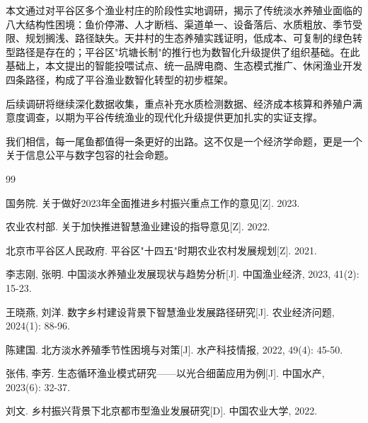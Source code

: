 \documentclass[12pt,a4paper]{article}
\begin{document}
本文通过对平谷区多个渔业村庄的阶段性实地调研，揭示了传统淡水养殖业面临的八大结构性困境：鱼价停滞、人才断档、渠道单一、设备落后、水质粗放、季节受限、规划搁浅、路径缺失。天井村的生态养殖实践证明，低成本、可复制的绿色转型路径是存在的；平谷区"坑塘长制"的推行也为数智化升级提供了组织基础。在此基础上，本文提出的智能投喂试点、统一品牌电商、生态模式推广、休闲渔业开发四条路径，构成了平谷渔业数智化转型的初步框架。

后续调研将继续深化数据收集，重点补充水质检测数据、经济成本核算和养殖户满意度调查，以期为平谷传统渔业的现代化升级提供更加扎实的实证支撑。

我们相信，每一尾鱼都值得一条更好的出路。这不仅是一个经济学命题，更是一个关于信息公平与数字包容的社会命题。

\vspace{1cm}
\begin{thebibliography}{99}

 国务院. 关于做好2023年全面推进乡村振兴重点工作的意见[Z]. 2023.

 农业农村部. 关于加快推进智慧渔业建设的指导意见[Z]. 2022.

 北京市平谷区人民政府. 平谷区"十四五"时期农业农村发展规划[Z]. 2021.

 李志刚, 张明. 中国淡水养殖业发展现状与趋势分析[J]. 中国渔业经济, 2023, 41(2): 15-23.

 王晓燕, 刘洋. 数字乡村建设背景下智慧渔业发展路径研究[J]. 农业经济问题, 2024(1): 88-96.

 陈建国. 北方淡水养殖季节性困境与对策[J]. 水产科技情报, 2022, 49(4): 45-50.

 张伟, 李芳. 生态循环渔业模式研究——以光合细菌应用为例[J]. 中国水产, 2023(6): 32-37.

 刘文. 乡村振兴背景下北京都市型渔业发展研究[D]. 中国农业大学, 2022.

\end{thebibliography}
\end{document}
